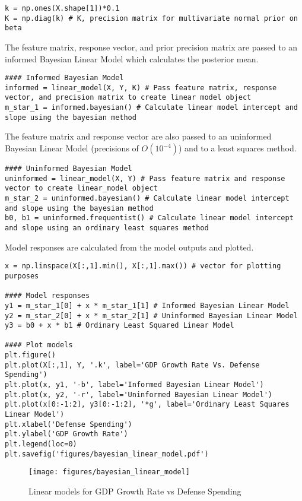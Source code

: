 \documentclass[10pt]{article}
\begin{document}
\begin{enumerate}[label=(\Alph*)]
\begin{lstlisting}
k = np.ones(X.shape[1])*0.1
K = np.diag(k) # K, precision matrix for multivariate normal prior on beta
        \end{lstlisting}

        The feature matrix, response vector, and prior precision matrix are passed to an informed Bayesian Linear Model which calculates the posterior mean.

        \begin{lstlisting}
#### Informed Bayesian Model
informed = linear_model(X, Y, K) # Pass feature matrix, response vector, and precision matrix to create linear model object
m_star_1 = informed.bayesian() # Calculate linear model intercept and slope using the bayesian method
        \end{lstlisting}

        The feature matrix and response vector are also passed to an uninformed Bayesian Linear Model (precisions of $O (10^{-4})$) and to a least squares method.

        \begin{lstlisting}
#### Uninformed Bayesian Model
uninformed = linear_model(X, Y) # Pass feature matrix and response vector to create linear_model object
m_star_2 = uninformed.bayesian() # Calculate linear model intercept and slope using the bayesian method
b0, b1 = uninformed.frequentist() # Calculate linear model intercept and slope using an ordinary least squares method
        \end{lstlisting}

        Model responses are calculated from the model outputs and plotted.

        \begin{lstlisting}
x = np.linspace(X[:,1].min(), X[:,1].max()) # vector for plotting purposes

#### Model responses
y1 = m_star_1[0] + x * m_star_1[1] # Informed Bayesian Linear Model
y2 = m_star_2[0] + x * m_star_2[1] # Uninformed Bayesian Linear Model
y3 = b0 + x * b1 # Ordinary Least Squared Linear Model

#### Plot models
plt.figure()
plt.plot(X[:,1], Y, '.k', label='GDP Growth Rate Vs. Defense Spending')
plt.plot(x, y1, '-b', label='Informed Bayesian Linear Model')
plt.plot(x, y2, '-r', label='Uninformed Bayesian Linear Model')
plt.plot(x[0:-1:2], y3[0:-1:2], '*g', label='Ordinary Least Squares Linear Model')
plt.xlabel('Defense Spending')
plt.ylabel('GDP Growth Rate')
plt.legend(loc=0)
plt.savefig('figures/bayesian_linear_model.pdf')
        \end{lstlisting}

        \begin{figure}[ht] 
          \centering 
          \texttt{[image: figures/bayesian\_linear\_model]}
          \caption{\label{fig:bayesian_linear_model}Linear models for GDP Growth Rate vs Defense Spending}
        \end{figure}


    \end{enumerate}
\end{document}
